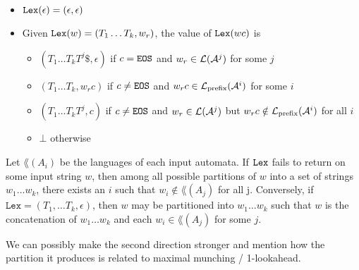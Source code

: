 \begin{definition}[Lexer]
\begin{definition}
    \label{def:PartialLexer}
    \begin{itemize}
    \item $\mathtt{Lex}(\epsilon) = (\epsilon, \epsilon)$
    \item Given $\mathtt{Lex}(w) = (T_1 \ldots T_k, w_r)$, the value of $\mathtt{Lex}(wc)$ is
        \begin{itemize}
        \item $(T_1 \ldots T_k T^j \$, \epsilon)$ if $c = \texttt{EOS}$ and $w_r \in \mathcal{L}(\mathcal{A}^j)$ for some $j$
        \item $(T_1 \ldots T_k, w_r c)$ if $c \neq \texttt{EOS}$ and $w_r c \in \mathcal{L}_{\mathrm{prefix}}(\mathcal{A}^i)$ for some $i$
        \item $(T_1 \ldots T_k T^j, c)$ if $c \neq \texttt{EOS}$ and $w_r \in \mathcal{L}(\mathcal{A}^j)$ but $w_r c \notin \mathcal{L}_{\mathrm{prefix}}(\mathcal{A}^i)$ for all $i$
        \item $\bot$ otherwise %
        \end{itemize}
    \end{itemize}
\end{definition}

\begin{theorem}
    \label{thm:LexSplit}
    Let $\lang(A_i)$ be the languages of each input automata.
    If $\mathtt{Lex}$ fails to return on some input string $w$, then among all possible partitions of $w$ into a set of strings $w_1 \ldots w_k$, there exists an $i$ such that $w_i \notin \lang(A_j)$ for all j. Conversely, if $\texttt{Lex} = (T_1, \ldots T_k, \epsilon)$, then $w$ may be partitioned into $w_1 \ldots w_k$ such that $w$ is the concatenation of $w_1 \ldots w_k$ and each $w_i \in \lang(A_j)$ for some $j$.
\end{theorem}
We can possibly make the second direction stronger and mention how the partition it produces is related to maximal munching / 1-lookahead.


\end{definition}
